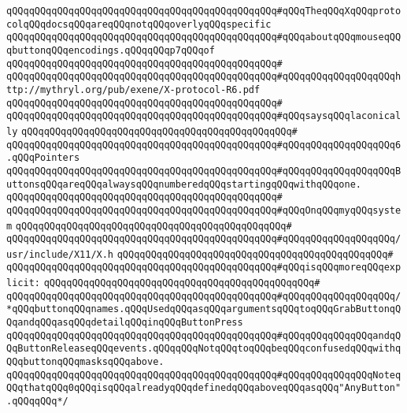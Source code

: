\verb|qQQqqQQqqQQqqQQqqQQqqQQqqQQqqQQqqQQqqQQqqQQqqQQq#qQQqTheqQQqXqQQqprotocolqQQqdocsqQQqareqQQqnotqQQqoverlyqQQqspecific|\newline
\verb|qQQqqQQqqQQqqQQqqQQqqQQqqQQqqQQqqQQqqQQqqQQqqQQq#qQQqaboutqQQqmouseqQQqbuttonqQQqencodings.qQQqqQQqp7qQQqof|\newline
\verb|qQQqqQQqqQQqqQQqqQQqqQQqqQQqqQQqqQQqqQQqqQQqqQQq#|\newline
\verb|qQQqqQQqqQQqqQQqqQQqqQQqqQQqqQQqqQQqqQQqqQQqqQQq#qQQqqQQqqQQqqQQqqQQqhttp://mythryl.org/pub/exene/X-protocol-R6.pdf|\newline
\verb|qQQqqQQqqQQqqQQqqQQqqQQqqQQqqQQqqQQqqQQqqQQqqQQq#|\newline
\verb|qQQqqQQqqQQqqQQqqQQqqQQqqQQqqQQqqQQqqQQqqQQqqQQq#qQQqsaysqQQqlaconically|\newline
\verb|qQQqqQQqqQQqqQQqqQQqqQQqqQQqqQQqqQQqqQQqqQQqqQQq#|\newline
\verb|qQQqqQQqqQQqqQQqqQQqqQQqqQQqqQQqqQQqqQQqqQQqqQQq#qQQqqQQqqQQqqQQqqQQq6.qQQqPointers|\newline
\verb|qQQqqQQqqQQqqQQqqQQqqQQqqQQqqQQqqQQqqQQqqQQqqQQq#qQQqqQQqqQQqqQQqqQQqButtonsqQQqareqQQqalwaysqQQqnumberedqQQqstartingqQQqwithqQQqone.|\newline
\verb|qQQqqQQqqQQqqQQqqQQqqQQqqQQqqQQqqQQqqQQqqQQqqQQq#|\newline
\verb|qQQqqQQqqQQqqQQqqQQqqQQqqQQqqQQqqQQqqQQqqQQqqQQq#qQQqOnqQQqmyqQQqsystem|\newline
\verb|qQQqqQQqqQQqqQQqqQQqqQQqqQQqqQQqqQQqqQQqqQQqqQQq#|\newline
\verb|qQQqqQQqqQQqqQQqqQQqqQQqqQQqqQQqqQQqqQQqqQQqqQQq#qQQqqQQqqQQqqQQqqQQq/usr/include/X11/X.h|\newline
\verb|qQQqqQQqqQQqqQQqqQQqqQQqqQQqqQQqqQQqqQQqqQQqqQQq#|\newline
\verb|qQQqqQQqqQQqqQQqqQQqqQQqqQQqqQQqqQQqqQQqqQQqqQQq#qQQqisqQQqmoreqQQqexplicit:|\newline
\verb|qQQqqQQqqQQqqQQqqQQqqQQqqQQqqQQqqQQqqQQqqQQqqQQq#|\newline
\verb|qQQqqQQqqQQqqQQqqQQqqQQqqQQqqQQqqQQqqQQqqQQqqQQq#qQQqqQQqqQQqqQQqqQQq/*qQQqbuttonqQQqnames.qQQqUsedqQQqasqQQqargumentsqQQqtoqQQqGrabButtonqQQqandqQQqasqQQqdetailqQQqinqQQqButtonPress|\newline
\verb|qQQqqQQqqQQqqQQqqQQqqQQqqQQqqQQqqQQqqQQqqQQqqQQq#qQQqqQQqqQQqqQQqandqQQqButtonReleaseqQQqevents.qQQqqQQqNotqQQqtoqQQqbeqQQqconfusedqQQqwithqQQqbuttonqQQqmasksqQQqabove.|\newline
\verb|qQQqqQQqqQQqqQQqqQQqqQQqqQQqqQQqqQQqqQQqqQQqqQQq#qQQqqQQqqQQqqQQqNoteqQQqthatqQQq0qQQqisqQQqalreadyqQQqdefinedqQQqaboveqQQqasqQQq"AnyButton".qQQqqQQq*/|\newline
